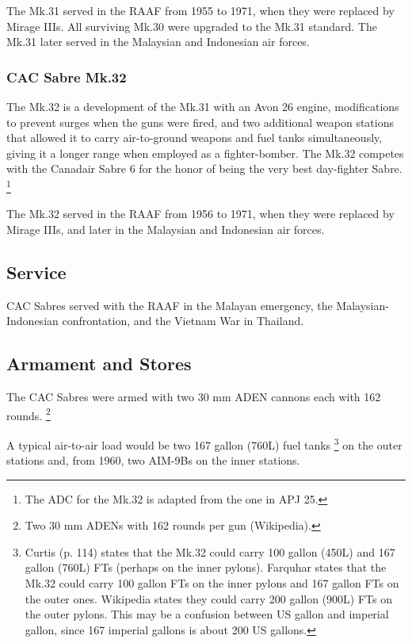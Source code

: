 The Mk.31 served in the RAAF from 1955 to 1971, when they were replaced by Mirage IIIs. All surviving Mk.30 were upgraded to the Mk.31 standard. The Mk.31 later served in the Malaysian and Indonesian air forces.

\subsubsection{CAC Sabre Mk.32}

The Mk.32 is a development of the Mk.31 with an Avon 26 engine, modifications to prevent surges when the guns were fired, and two additional weapon stations that allowed it to carry air-to-ground weapons and fuel tanks simultaneously, giving it a longer range when employed as a fighter-bomber. The Mk.32 competes with the Canadair Sabre 6 for the honor of being the very best day-fighter Sabre.%
\footnote{
    The ADC for the Mk.32 is adapted from the one in APJ 25.
}

The Mk.32 served in the RAAF from 1956 to 1971, when they were replaced by Mirage IIIs, and later in the Malaysian and Indonesian air forces.

\subsection{Service}

CAC Sabres served with the RAAF in the Malayan emergency, the Malaysian-Indonesian confrontation, and the Vietnam War in Thailand.

\subsection{Armament and Stores}

The CAC Sabres were armed with two 30 mm ADEN cannons each with 162 rounds.%
\footnote{
    Two 30 mm ADENs with 162 rounds per gun (Wikipedia).
}

A typical air-to-air load would be two 167 gallon (760L) fuel tanks%
\footnote{
    Curtis (p. 114) states that the Mk.32 could carry 100 gallon (450L) and 167 gallon (760L) FTs (perhaps on the inner pylons). Farquhar states that the Mk.32 could carry 100 gallon FTs on the inner pylons and 167 gallon FTs on the outer ones. Wikipedia states they could carry 200 gallon (900L) FTs on the outer pylons. This may be a confusion between US gallon and imperial gallon, since 167 imperial gallons is about 200 US gallons.
}
on the outer stations and, from 1960, two AIM-9Bs on the inner stations.

